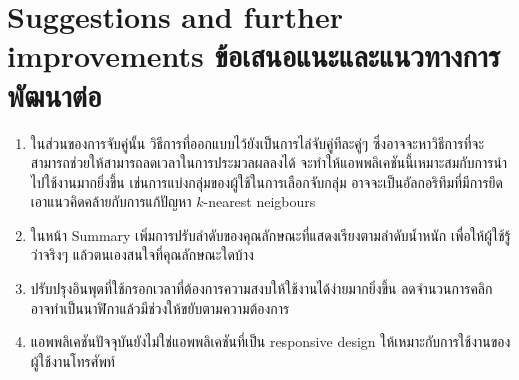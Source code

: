 \section{\ifenglish%
Suggestions and further improvements
\else%
ข้อเสนอแนะและแนวทางการพัฒนาต่อ
\fi
}
\begin{enumerate}
  \item ในส่วนของการจับคู่นั้น วิธีการที่ออกแบบไว้ยังเป็นการไล่จับคู่ทีละคู่ๆ ซึ่งอาจจะหาวิธีการที่จะสามารถช่วยให้สามารถลดเวลาในการประมวลผลลงได้ 
  จะทำให้แอพพลิเคชันนี้เหมาะสมกับการนำไปใช้งานมากยิ่งขึ้น เช่นการแบ่งกลุ่มของผู้ใช้ในการเลือกจับกลุ่ม อาจจะเป็นอัลกอริทึมที่มีการยึดเอาแนวคิดคล้ายกับการแก้ปัญหา 
  $k$-nearest neigbours~\cite{knn}
  \item ในหน้า Summary เพิ่มการปรับลำดับของคุณลักษณะที่แสดงเรียงตามลำดับน้ำหนัก เพื่อให้ผู้ใช้รู้ว่าจริงๆ แล้วตนเองสนใจที่คุณลักษณะใดบ้าง
  \item ปรับปรุงอินพุตที่ใช้กรอกเวลาที่ต้องการความสงบให้ใช้งานได้ง่ายมากยิ่งขึ้น ลดจำนวนการคลิก อาจทำเป็นนาฬิกาแล้วมีช่วงให้ขยับตามความต้องการ
  \item แอพพลิเคชันปัจจุบันยังไม่ใช่แอพพลิเคชันที่เป็น responsive design ให้เหมาะกับการใช้งานของผู้ใช้งานโทรศัพท์
\end{enumerate}









